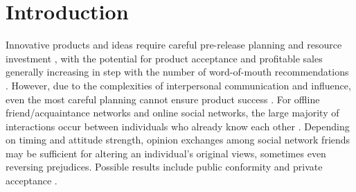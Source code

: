 \documentclass[10pt,letterpaper]{article}
\begin{document}
\section*{Introduction}

Innovative products and ideas require careful pre-release planning and resource investment \cite{Mahajan1996}, with the potential for product acceptance and profitable sales generally increasing in step with the number of word-of-mouth recommendations \cite{Galam1990,Liu2020,Mazzarol2011}. However, due to the complexities of interpersonal communication and influence, even the most careful planning cannot ensure product success \cite{Bhukya2023,Hegselmann2002,Rogers2003,Melnyk2022,Miranda2024,Watts2004}. For offline friend/acquaintance networks and online social networks, the large majority of interactions occur between individuals who already know each other \cite{Mutlu2021,Valente1996}. Depending on timing and attitude strength, opinion exchanges among social network friends may be sufficient for altering an individual's original views, sometimes even reversing prejudices. Possible results include public conformity and private acceptance \cite{Wang2014,Wang2022}.
\end{document}
